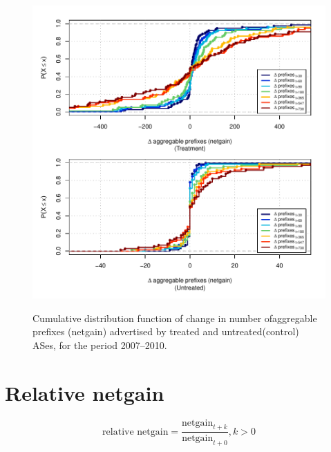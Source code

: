 \begin{figure}[H]
\begin{centering}
\begin{singlespace}
    \includegraphics[width=6in]{figures/behavior-netgain-2007_2010-corr.pdf}
    \vspace{-2em}\\
    \caption{Cumulative distribution function of change in number ofaggregable
    prefixes (netgain) advertised by treated and untreated(control) ASes, for
    the period 2007--2010.}
\end{singlespace}
\end{centering}
\end{figure}

\section{Relative netgain}

\[
\textrm{relative netgain} = \frac{\textrm{netgain}_{t+k}}
                                 {\textrm{netgain}_{t+0}}, k > 0
\]

